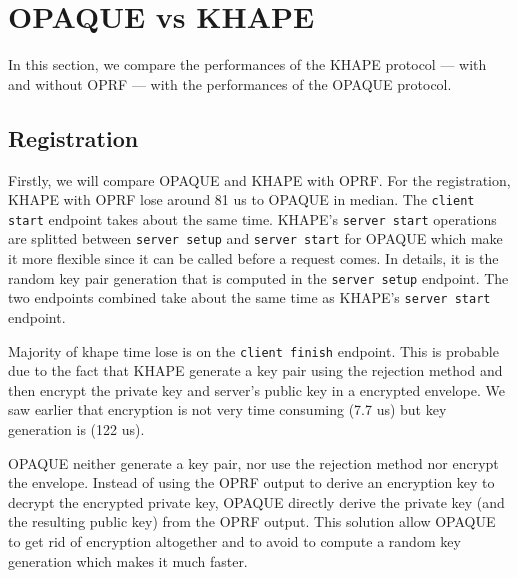 \documentclass[../report.tex]{subfiles}
\begin{document}
\section{OPAQUE vs KHAPE} %

In this section, we compare the performances of the KHAPE protocol --- with and without OPRF --- with the performances of the OPAQUE protocol.


\pgfplotsset{width=\textwidth-2.4cm}


\subsection*{Registration}

Firstly, we will compare OPAQUE and KHAPE with OPRF.
For the registration, KHAPE with OPRF lose around 81 us to OPAQUE in median.
The \verb|client start| endpoint takes about the same time. KHAPE's \verb|server start| operations are splitted between \verb|server setup| and \verb|server start| for OPAQUE which make it more flexible since it can be called before a request comes. In details, it is the random key pair generation that is computed in the \verb|server setup| endpoint. The two endpoints combined take about the same time as KHAPE's \verb|server start| endpoint.

Majority of khape time lose is on the \verb|client finish| endpoint.
This is probable due to the fact that KHAPE generate a key pair using the rejection method and then encrypt the private key and server's public key in a encrypted envelope.
We saw earlier that encryption is not very time consuming (7.7 us) but key generation is (122 us).

OPAQUE neither generate a key pair, nor use the rejection method nor encrypt the envelope.
Instead of using the OPRF output to derive an encryption key to decrypt the encrypted private key, OPAQUE directly derive the private key (and the resulting public key) from the OPRF output. This solution allow OPAQUE to get rid of encryption altogether and to avoid to compute a random key generation which makes it much faster.
\end{document}
